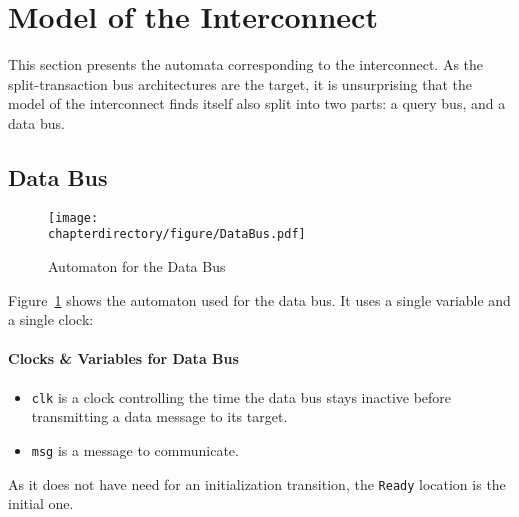 \section{Model of the Interconnect}
\label{sec:model:bus}
This section presents the automata corresponding to the interconnect. As the
split-transaction bus architectures are the target, it is unsurprising that the
model of the interconnect finds itself also split into two parts: a query bus,
and a data bus.

\subsection{Data Bus}
\begin{figure}[hbt!]
\begin{center}
\texttt{[image: \\chapterdirectory/figure/DataBus.pdf]}
\end{center}
\caption{Automaton for the Data Bus}
\label{fig:UPPAAL:DataBus}
\end{figure}

Figure~\ref{fig:UPPAAL:DataBus} shows the automaton used for the data bus.  It
uses a single variable and a single clock:
\paragraph{Clocks \& Variables for Data Bus}
\begin{itemize}
\item
   \lstinline!clk! is a clock controlling the time the data bus stays
   inactive before transmitting a data message to its target.
\item
   \lstinline!msg! is a message to communicate.
\end{itemize}

As it does not have need for an initialization transition, the \texttt{Ready}
location is the initial one.

